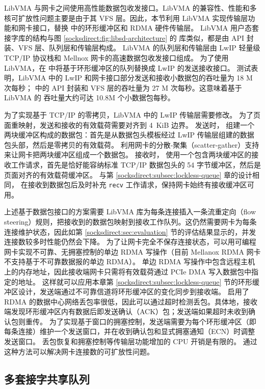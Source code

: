 LibVMA 与网卡之间使用高性能数据包收发接口。LibVMA 的兼容性、性能和多核可扩放性问题主要是由于其 VFS 层。因此，本节利用 LibVMA 实现传输层功能和网卡接口，替换 \libipc{} 中的环形缓冲区和 RDMA 硬件传输层。
LibVMA \cite{libvma} 用户态套接字库的结构与图 \ref{socksdirect:fig:libsd-architecture} 的 \libipc{} 库类似，都是由 API 封装、VFS 层、队列层和传输层构成。
LibVMA 的队列层和传输层由 LwIP 轻量级 TCP/IP 协议栈和 Mellnox 网卡的高速数据包收发接口组成。
为了使用 LibVMA，在 \libipc{} 中将基于环形缓冲区的队列替换成 LwIP 的发送接收接口。
测试表明，LibVMA 中的 LwIP 和网卡接口部分发送和接收小数据包的吞吐量为 18 M 次每秒；\libipc{} 中的 API 封装和 VFS 层的吞吐量为 27 M 次每秒。这意味着基于 LibVMA 的 \libipc{} 吞吐量大约可达 10.8M 个小数据包每秒。

为了实现基于 TCP/IP 的零拷贝，LibVMA 中的 LwIP 传输层需要修改。
为了页面重映射，发送和接收的有效载荷需要对齐到 4~KiB 边界。
发送时，\libipc{} 组建一个两块缓冲区构成的数据包：首先是从数据包头模板经过 LwIP 传输层组建的数据包头部，然后是零拷贝的有效载荷。
\libipc{} 利用网卡的分散-聚集（scatter-gather）支持来让网卡把两块缓冲区组成一个数据包。
接收时，\libipc{} 使用一个包含两块缓冲区的接收工作请求，首先是恰好能容纳标准 TCP/IP 数据包头的 54 字节缓冲区，然后是页面对齐的有效载荷缓冲区。
与第 \ref{socksdirect:subsec:lockless-queue} 章的设计相同，\libipc{} 在接收到数据包后及时补充 \texttt{recv} 工作请求，保持网卡始终有接收缓冲区可用。


上述基于数据包接口的方案需要 LibVMA 库为每条连接插入一条流重定向（flow steering）规则，把接收到的数据包映射到接收工作队列。这仍然需要网卡为每条连接维护状态，因此如第 \ref{socksdirect:sec:evaluation} 节的评估结果显示的，并发连接数较多时性能仍然会下降。
为了让网卡完全不保存连接状态，可以用可编程网卡实现不可靠、无拥塞控制的单边 RDMA 写操作（目前 Mellanox RDMA 网卡不支持基于不可靠数据报的单边 RDMA）。
单边 RDMA 写操作中包含远程主机上的内存地址，因此接收端网卡只需将有效载荷通过 PCIe DMA 写入数据包中指定的地址。
这样就可以应用本章第 \ref{socksdirect:subsec:lockless-queue} 节的环形缓冲区设计，发送端通过不可靠信道将环形缓冲区的变化同步到接收端。
启用了 RDMA 的数据中心网络丢包率很低，因此可以通过超时检测丢包。具体地，接收端发现环形缓冲区内有数据后即发送确认（ACK）包；发送端如果超时未收到确认包则重传。
为了实现基于窗口的拥塞控制，发送端需要为每个环形缓冲区（即每条连接）维护一个发送窗口，并在收到确认包和显式拥塞通知（ECN）时调整发送窗口。
丢包恢复和拥塞控制等传输层功能增加的 CPU 开销是有限的。
通过这种方法可以解决网卡连接数的可扩放性问题。


\subsection{多套接字共享队列}
\label{socksdirect:subsec:multiplex-conn}

